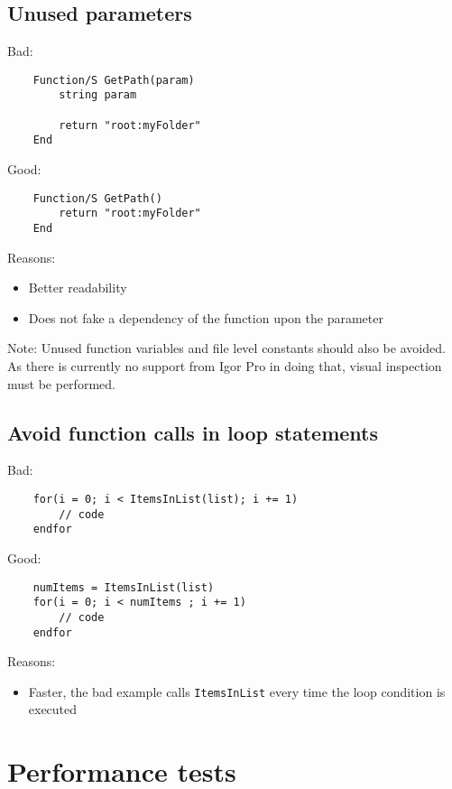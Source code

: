 \documentclass{scrartcl}
\begin{document}
\subsection{Unused parameters}
Bad:
\begin{verbatim}
	Function/S GetPath(param)
		string param

		return "root:myFolder"
	End
\end{verbatim}
\pagebreak
Good:
\begin{verbatim}
	Function/S GetPath()
		return "root:myFolder"
	End
\end{verbatim}
Reasons:
\begin{itemize}
  \item Better readability
  \item Does not fake a dependency of the function upon the parameter
\end{itemize}
Note: Unused function variables and file level constants should also be avoided. As there is currently no support from
Igor Pro in doing that, visual inspection must be performed.
%
\subsection{Avoid function calls in loop statements}
Bad:
\begin{verbatim}
	for(i = 0; i < ItemsInList(list); i += 1)
		// code
	endfor
\end{verbatim}
Good:
\begin{verbatim}
	numItems = ItemsInList(list)
	for(i = 0; i < numItems ; i += 1)
		// code
	endfor
\end{verbatim}
Reasons:
\begin{itemize}
  \item Faster, the bad example calls \texttt{ItemsInList} every time the loop condition is executed
\end{itemize}
%
\section{Performance tests}
%
\end{document}
